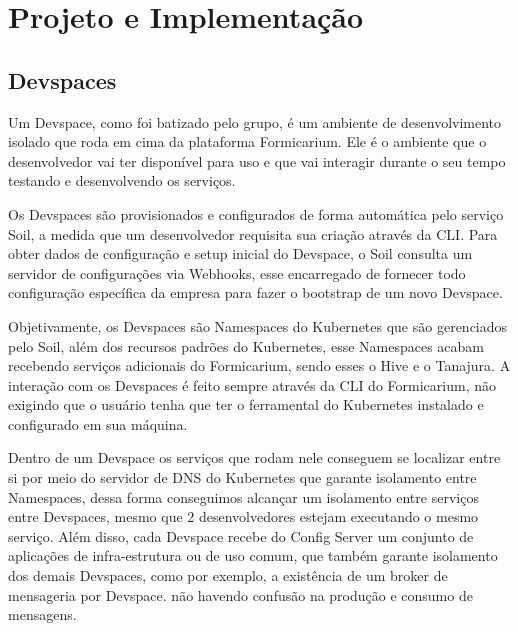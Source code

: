\documentclass[twosideprint]{politex}
\begin{document}
	
\chapter{Projeto e Implementação}
    
    \section{Devspaces}
    
    Um Devspace, como foi batizado pelo grupo, é um ambiente de desenvolvimento isolado que roda em cima da plataforma Formicarium. Ele é o ambiente que o desenvolvedor vai ter disponível para uso e que vai interagir durante o seu tempo testando e desenvolvendo os serviços. 
    
    Os Devspaces são provisionados e configurados de forma automática pelo serviço Soil, a medida que um desenvolvedor requisita sua criação através da CLI. Para obter dados de configuração e setup inicial do Devspace, o Soil consulta um servidor de configurações via Webhooks, esse encarregado de fornecer todo configuração específica da empresa para fazer o bootstrap de um novo Devspace.
    
    Objetivamente, os Devspaces são Namespaces do Kubernetes que são gerenciados pelo Soil, além dos recursos padrões do Kubernetes, esse Namespaces acabam recebendo serviços adicionais do Formicarium, sendo esses o Hive e o Tanajura. A interação com os Devspaces é feito sempre através da CLI do Formicarium, não exigindo que o usuário tenha que ter o ferramental do Kubernetes instalado e configurado em sua máquina.
    
    Dentro de um Devspace os serviços que rodam nele conseguem se localizar entre si por meio do servidor de DNS do Kubernetes que garante isolamento entre Namespaces, dessa forma conseguimos alcançar um isolamento entre serviços entre Devspaces, mesmo que 2 desenvolvedores estejam executando o mesmo serviço. Além disso, cada Devspace recebe do Config Server um conjunto de aplicações de infra-estrutura ou de uso comum, que também garante isolamento dos demais Devspaces, como por exemplo, a existência de um broker de mensageria por Devspace. não havendo confusão na produção e consumo de mensagens.
    
\end{document}
